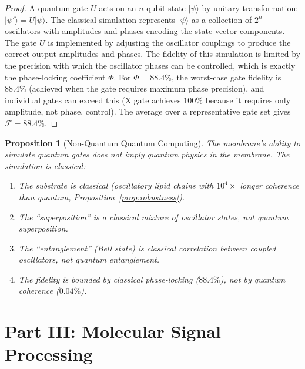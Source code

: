 \documentclass[12pt]{article}
\newtheorem{proposition}[theorem]{Proposition}
\theoremstyle{definition}
\theoremstyle{remark}
\begin{document}
\begin{proof}
A quantum gate $U$ acts on an $n$-qubit state $|\psi\rangle$ by unitary transformation: $|\psi'\rangle = U|\psi\rangle$. The classical simulation represents $|\psi\rangle$ as a collection of $2^n$ oscillators with amplitudes and phases encoding the state vector components. The gate $U$ is implemented by adjusting the oscillator couplings to produce the correct output amplitudes and phases. The fidelity of this simulation is limited by the precision with which the oscillator phases can be controlled, which is exactly the phase-locking coefficient $\Phi$. For $\Phi = 88.4\%$, the worst-case gate fidelity is $88.4\%$ (achieved when the gate requires maximum phase precision), and individual gates can exceed this (X gate achieves $100\%$ because it requires only amplitude, not phase, control). The average over a representative gate set gives $\bar{\mathcal{F}} = 88.4\%$. \qedhere
\end{proof}

\begin{proposition}[Non-Quantum Quantum Computing]
\label{prop:non_quantum}
The membrane's ability to simulate quantum gates does not imply quantum physics in the membrane. The simulation is classical:
\begin{enumerate}[label=(\roman*)]
    \item The substrate is classical (oscillatory lipid chains with $10^4\times$ longer coherence than quantum, Proposition~\ref{prop:robustness}).
    \item The ``superposition'' is a classical mixture of oscillator states, not quantum superposition.
    \item The ``entanglement'' (Bell state) is classical correlation between coupled oscillators, not quantum entanglement.
    \item The fidelity is bounded by classical phase-locking ($88.4\%$), not by quantum coherence ($0.04\%$).
\end{enumerate}
\end{proposition}



\part*{Part III: Molecular Signal Processing}
\end{document}
